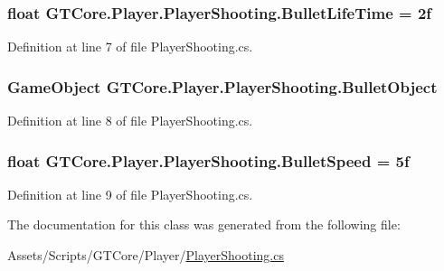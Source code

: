 \subsubsection[{Bullet\+Life\+Time}]{\setlength{\rightskip}{0pt plus 5cm}float G\+T\+Core.\+Player.\+Player\+Shooting.\+Bullet\+Life\+Time = 2f}\label{class_g_t_core_1_1_player_1_1_player_shooting_a155b801d0290db5d7f22570912a391ba}


Definition at line 7 of file Player\+Shooting.\+cs.

\hypertarget{class_g_t_core_1_1_player_1_1_player_shooting_a51b4f43ad1484327b923fd5ee6aa3e88}{}
\subsubsection[{Bullet\+Object}]{\setlength{\rightskip}{0pt plus 5cm}Game\+Object G\+T\+Core.\+Player.\+Player\+Shooting.\+Bullet\+Object}\label{class_g_t_core_1_1_player_1_1_player_shooting_a51b4f43ad1484327b923fd5ee6aa3e88}


Definition at line 8 of file Player\+Shooting.\+cs.

\hypertarget{class_g_t_core_1_1_player_1_1_player_shooting_a4666947a39a68d315e612c4b8fd27804}{}
\subsubsection[{Bullet\+Speed}]{\setlength{\rightskip}{0pt plus 5cm}float G\+T\+Core.\+Player.\+Player\+Shooting.\+Bullet\+Speed = 5f}\label{class_g_t_core_1_1_player_1_1_player_shooting_a4666947a39a68d315e612c4b8fd27804}


Definition at line 9 of file Player\+Shooting.\+cs.



The documentation for this class was generated from the following file\+:\begin{DoxyCompactItemize}
\item 
Assets/\+Scripts/\+G\+T\+Core/\+Player/\hyperlink{_player_shooting_8cs}{Player\+Shooting.\+cs}\end{DoxyCompactItemize}
